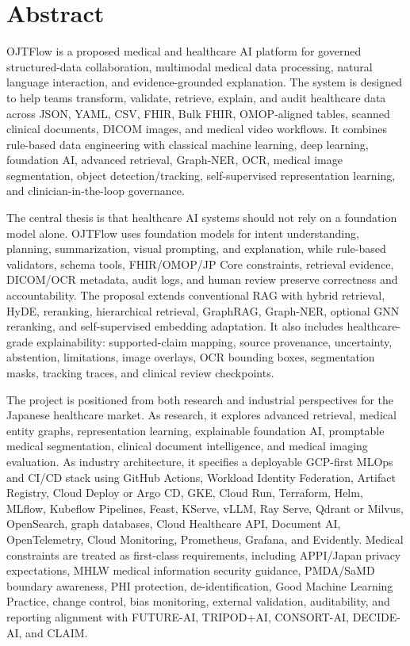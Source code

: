 \section*{Abstract}

OJTFlow is a proposed medical and healthcare AI platform for governed structured-data collaboration, multimodal medical data processing, natural language interaction, and evidence-grounded explanation. The system is designed to help teams transform, validate, retrieve, explain, and audit healthcare data across JSON, YAML, CSV, FHIR, Bulk FHIR, OMOP-aligned tables, scanned clinical documents, DICOM images, and medical video workflows. It combines rule-based data engineering with classical machine learning, deep learning, foundation AI, advanced retrieval, Graph-NER, OCR, medical image segmentation, object detection/tracking, self-supervised representation learning, and clinician-in-the-loop governance.

The central thesis is that healthcare AI systems should not rely on a foundation model alone. OJTFlow uses foundation models for intent understanding, planning, summarization, visual prompting, and explanation, while rule-based validators, schema tools, FHIR/OMOP/JP Core constraints, retrieval evidence, DICOM/OCR metadata, audit logs, and human review preserve correctness and accountability. The proposal extends conventional RAG with hybrid retrieval, HyDE, reranking, hierarchical retrieval, GraphRAG, Graph-NER, optional GNN reranking, and self-supervised embedding adaptation. It also includes healthcare-grade explainability: supported-claim mapping, source provenance, uncertainty, abstention, limitations, image overlays, OCR bounding boxes, segmentation masks, tracking traces, and clinical review checkpoints.

The project is positioned from both research and industrial perspectives for the Japanese healthcare market. As research, it explores advanced retrieval, medical entity graphs, representation learning, explainable foundation AI, promptable medical segmentation, clinical document intelligence, and medical imaging evaluation. As industry architecture, it specifies a deployable GCP-first MLOps and CI/CD stack using GitHub Actions, Workload Identity Federation, Artifact Registry, Cloud Deploy or Argo CD, GKE, Cloud Run, Terraform, Helm, MLflow, Kubeflow Pipelines, Feast, KServe, vLLM, Ray Serve, Qdrant or Milvus, OpenSearch, graph databases, Cloud Healthcare API, Document AI, OpenTelemetry, Cloud Monitoring, Prometheus, Grafana, and Evidently. Medical constraints are treated as first-class requirements, including APPI/Japan privacy expectations, MHLW medical information security guidance, PMDA/SaMD boundary awareness, PHI protection, de-identification, Good Machine Learning Practice, change control, bias monitoring, external validation, auditability, and reporting alignment with FUTURE-AI, TRIPOD+AI, CONSORT-AI, DECIDE-AI, and CLAIM.

